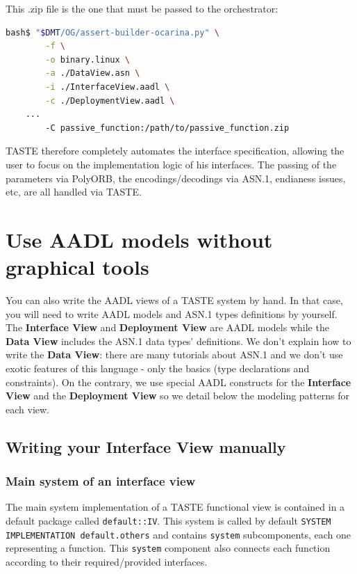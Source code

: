 \documentclass[11pt]{book}
\newcommand{\Concept}[1]{#1\xspace}
\newcommand{\aadl}{\Concept{AADL}}
\newcommand{\taste}{\Concept{TASTE}}
\begin{document}
This .zip file is the one that must be passed to the orchestrator:

\begin{lstlisting}[language=bash]
bash$ "$DMT/OG/assert-builder-ocarina.py" \
        -f \
        -o binary.linux \
        -a ./DataView.asn \
        -i ./InterfaceView.aadl \
        -c ./DeploymentView.aadl \
	...
        -C passive_function:/path/to/passive_function.zip
\end{lstlisting}

TASTE therefore completely automates the interface specification, allowing the user
to focus on the implementation logic of his interfaces. The passing of the parameters
via PolyORB, the encodings/decodings via ASN.1, endianess issues, etc, are all
handled via TASTE.

\chapter{Use \aadl models without graphical tools}
You can also write the AADL views of a TASTE system by hand. In that case,
you will need to write \aadl models and ASN.1 types definitions by yourself. 
The \textbf{Interface View} and \textbf{Deployment View} are \aadl models while
the \textbf{Data View} includes the ASN.1 data types' definitions. We don't explain how to
write the \textbf{Data View}: there are many tutorials about ASN.1 and we don't
use exotic features of this language - only the basics (type declarations and 
constraints). On the contrary, we use special \aadl
constructs for the \textbf{Interface View} and the \textbf{Deployment View} so
we detail below the modeling patterns for each view.

   \section{Writing your Interface View manually}

      \subsection{Main system of an interface view}
      The main system implementation of a \taste functional view is contained in
      a default package called \texttt{default::IV}. This system  is called by
      default \texttt{SYSTEM IMPLEMENTATION default.others} and contains
      \texttt{system} subcomponents, each one representing a function. This
      \texttt{system} component also connects each function according to their
      required/provided interfaces.
\end{document}
